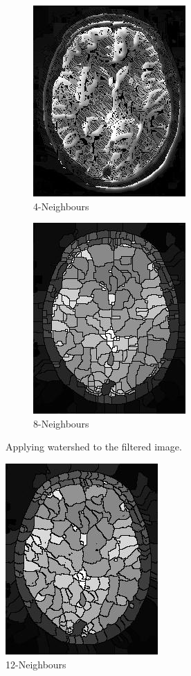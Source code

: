 \documentclass{article}
\begin{document}
\begin{figure}[H]
\centering
\begin{subfigure}{6cm}
  \centering
  \includegraphics[scale=0.6]{experiments/brain/brainBL_4.jpg}
  \caption{4-Neighbours}
  \label{fig:brain_6}
\end{subfigure}    
\begin{subfigure}{6cm}
  \centering
  \includegraphics[scale=0.6]{experiments/brain/brainBL_8.jpg}
  \caption{8-Neighbours}
  \label{fig:brain_7}
\end{subfigure}
\label{fig:brain3}
\caption{Applying watershed to the filtered image.}
\end{figure}
\begin{figure}[H]
  \centering
  \includegraphics[scale=0.6]{experiments/brain/brainBL_12.jpg}
  \caption{12-Neighbours}
  \label{fig:brain_8}
\end{figure}
\end{document}

